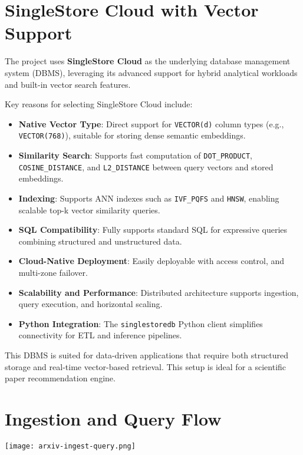 \documentclass[11pt]{article}
\begin{document}
\section*{SingleStore Cloud with Vector Support}
\label{sec:org63f0769}
The project uses \textbf{SingleStore Cloud} as the underlying database management system (DBMS), leveraging its advanced support for hybrid analytical workloads and built-in vector search features.

Key reasons for selecting SingleStore Cloud include:

\begin{itemize}
\item \textbf{Native Vector Type}: Direct support for \texttt{VECTOR(d)} column types (e.g., \texttt{VECTOR(768)}), suitable for storing dense semantic embeddings.
\item \textbf{Similarity Search}: Supports fast computation of \texttt{DOT\_PRODUCT}, \texttt{COSINE\_DISTANCE}, and \texttt{L2\_DISTANCE} between query vectors and stored embeddings.
\item \textbf{Indexing}: Supports ANN indexes such as \texttt{IVF\_PQFS} and \texttt{HNSW}, enabling scalable top-k vector similarity queries.
\item \textbf{SQL Compatibility}: Fully supports standard SQL for expressive queries combining structured and unstructured data.
\item \textbf{Cloud-Native Deployment}: Easily deployable with access control, and multi-zone failover.
\item \textbf{Scalability and Performance}: Distributed architecture supports ingestion, query execution, and horizontal scaling.
\item \textbf{Python Integration}: The \texttt{singlestoredb} Python client simplifies connectivity for ETL and inference pipelines.
\end{itemize}

This DBMS is suited for data-driven applications that require both structured storage and real-time vector-based retrieval. This setup is ideal for a scientific paper recommendation engine.
\section*{Ingestion and Query Flow}
\label{sec:orgc5af464}

\begin{center}
\texttt{[image: arxiv-ingest-query.png]}
\label{}
\end{center}
\end{document}
